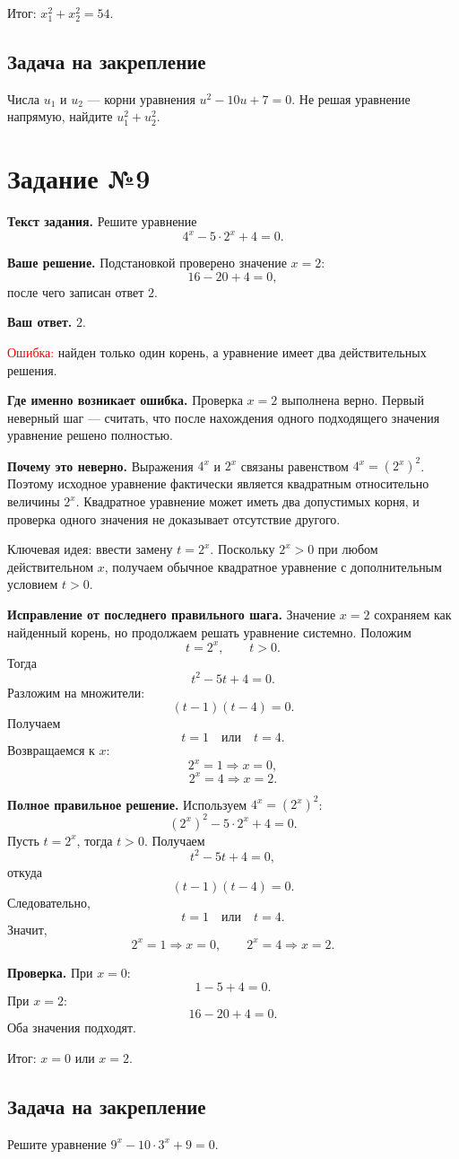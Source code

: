 \documentclass[12pt,a4paper]{article}
\newcommand{\err}{\textcolor{red}{Ошибка:}}
\newcommand{\idea}{\textcolor{blue!60!black}{Ключевая идея:}}
\newcommand{\result}{\textcolor{teal!60!black}{Итог:}}
\newcommand{\tasktitle}[1]{\phantomsection\label{task:#1}\section*{Задание №#1}}
\begin{document}
\result{} $x_1^2+x_2^2=54$.

\subsection*{Задача на закрепление}
Числа $u_1$ и $u_2$ --- корни уравнения $u^2-10u+7=0$. Не решая уравнение напрямую, найдите $u_1^2+u_2^2$.

\newpage
\tasktitle{9}
\textbf{Текст задания.} Решите уравнение
\[
4^x-5\cdot2^x+4=0.
\]

\textbf{Ваше решение.} Подстановкой проверено значение $x=2$:
\[
16-20+4=0,
\]
после чего записан ответ $2$.

\textbf{Ваш ответ.} $2$.

\err{} найден только один корень, а уравнение имеет два действительных решения.

\textbf{Где именно возникает ошибка.} Проверка $x=2$ выполнена верно. Первый неверный шаг --- считать, что после нахождения одного подходящего значения уравнение решено полностью.

\textbf{Почему это неверно.} Выражения $4^x$ и $2^x$ связаны равенством $4^x=(2^x)^2$. Поэтому исходное уравнение фактически является квадратным относительно величины $2^x$. Квадратное уравнение может иметь два допустимых корня, и проверка одного значения не доказывает отсутствие другого.

\idea{} ввести замену $t=2^x$. Поскольку $2^x>0$ при любом действительном $x$, получаем обычное квадратное уравнение с дополнительным условием $t>0$.

\textbf{Исправление от последнего правильного шага.} Значение $x=2$ сохраняем как найденный корень, но продолжаем решать уравнение системно. Положим
\[
t=2^x,\qquad t>0.
\]
Тогда
\[
t^2-5t+4=0.
\]
Разложим на множители:
\[
(t-1)(t-4)=0.
\]
Получаем
\[
t=1\quad\text{или}\quad t=4.
\]
Возвращаемся к $x$:
\[
2^x=1\Rightarrow x=0,
\]
\[
2^x=4\Rightarrow x=2.
\]

\textbf{Полное правильное решение.} Используем $4^x=(2^x)^2$:
\[
(2^x)^2-5\cdot2^x+4=0.
\]
Пусть $t=2^x$, тогда $t>0$. Получаем
\[
t^2-5t+4=0,
\]
откуда
\[
(t-1)(t-4)=0.
\]
Следовательно,
\[
t=1\quad\text{или}\quad t=4.
\]
Значит,
\[
2^x=1\Rightarrow x=0,
\qquad
2^x=4\Rightarrow x=2.
\]

\textbf{Проверка.} При $x=0$:
\[
1-5+4=0.
\]
При $x=2$:
\[
16-20+4=0.
\]
Оба значения подходят.

\result{} $x=0$ или $x=2$.

\subsection*{Задача на закрепление}
Решите уравнение $9^x-10\cdot3^x+9=0$.
\end{document}
